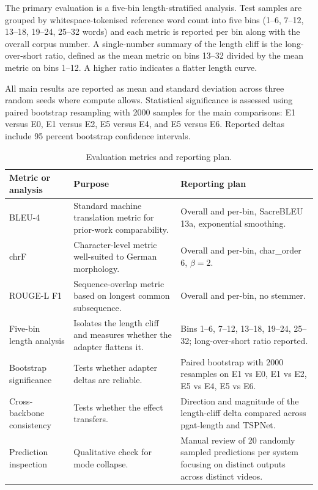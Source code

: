 The primary evaluation is a five-bin length-stratified analysis. Test samples are grouped by whitespace-tokenised reference word count into five bins (1--6, 7--12, 13--18, 19--24, 25--32 words) and each metric is reported per bin along with the overall corpus number. A single-number summary of the length cliff is the long-over-short ratio, defined as the mean metric on bins 13--32 divided by the mean metric on bins 1--12. A higher ratio indicates a flatter length curve.

All main results are reported as mean and standard deviation across three random seeds where compute allows. Statistical significance is assessed using paired bootstrap resampling with 2000 samples for the main comparisons: E1 versus E0, E1 versus E2, E5 versus E4, and E5 versus E6. Reported deltas include 95 percent bootstrap confidence intervals.

\begin{table}[h]
\caption{Evaluation metrics and reporting plan.}
\begin{center}
\begin{tabular}{p{1.2in}p{2.05in}p{2.1in}}
\toprule
Metric or analysis & Purpose & Reporting plan \\
\midrule
BLEU-4 & Standard machine translation metric for prior-work comparability. & Overall and per-bin, SacreBLEU 13a, exponential smoothing. \\
chrF & Character-level metric well-suited to German morphology. & Overall and per-bin, char\_order 6, $\beta = 2$. \\
ROUGE-L F1 & Sequence-overlap metric based on longest common subsequence. & Overall and per-bin, no stemmer. \\
Five-bin length analysis & Isolates the length cliff and measures whether the adapter flattens it. & Bins 1--6, 7--12, 13--18, 19--24, 25--32; long-over-short ratio reported. \\
Bootstrap significance & Tests whether adapter deltas are reliable. & Paired bootstrap with 2000 resamples on E1 vs E0, E1 vs E2, E5 vs E4, E5 vs E6. \\
Cross-backbone consistency & Tests whether the effect transfers. & Direction and magnitude of the length-cliff delta compared across pgat-length and TSPNet. \\
Prediction inspection & Qualitative check for mode collapse. & Manual review of 20 randomly sampled predictions per system focusing on distinct outputs across distinct videos. \\
\bottomrule
\end{tabular}
\label{tab:metrics-reporting}
\end{center}
\end{table}

